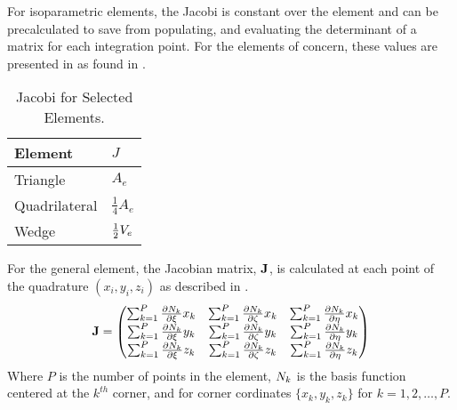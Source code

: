     For isoparametric elements, the Jacobi is constant over the element and can
    be precalculated to save from populating, and evaluating the 
    determinant of a matrix for each integration point. For the elements of 
    concern, these values are presented in  as found in 
    \cite{textbookcolorado}.
    \begin{table}
      \caption{Jacobi for Selected Elements.}
      \label{tab:jacobi}
      \begin{center}
        \begin{tabular}{ll}
          \toprule
          Element & $J$ \\
          \midrule
          Triangle      & $A_e$ \\
          Quadrilateral & $\frac{1}{4} A_e$ \\
          Wedge         & $\frac{1}{2} V_e$ \\
          \bottomrule
        \end{tabular}
      \end{center}
    \end{table}

    For the general element, the Jacobian matrix, $\mathbf{J}$, is calculated at each
    point of the quadrature $(x_i,y_i,z_i)$ as described in
    .
    \begin{equation}
      \label{eq:calcJacobian}
      \mathbf{J} = 
      \begin{pmatrix}
        \sum_{k=1}^P \frac{\partial N_k}{\partial \xi} x_k   &
        \sum_{k=1}^P \frac{\partial N_k}{\partial \zeta} x_k &
        \sum_{k=1}^P \frac{\partial N_k}{\partial \eta} x_k   \\
        \sum_{k=1}^P \frac{\partial N_k}{\partial \xi} y_k   &
        \sum_{k=1}^P \frac{\partial N_k}{\partial \zeta} y_k &
        \sum_{k=1}^P \frac{\partial N_k}{\partial \eta} y_k   \\
        \sum_{k=1}^P \frac{\partial N_k}{\partial \xi} z_k   &
        \sum_{k=1}^P \frac{\partial N_k}{\partial \zeta} z_k &
        \sum_{k=1}^P \frac{\partial N_k}{\partial \eta} z_k   \\
      \end{pmatrix}
    \end{equation}
    Where $P$ is the number of points in the element, $N_k$ is the basis
    function centered at the $k^{th}$ corner, and for corner cordinates 
    $\{x_k,y_k,z_k\}$ for $k = 1,2,\ldots,P$.

